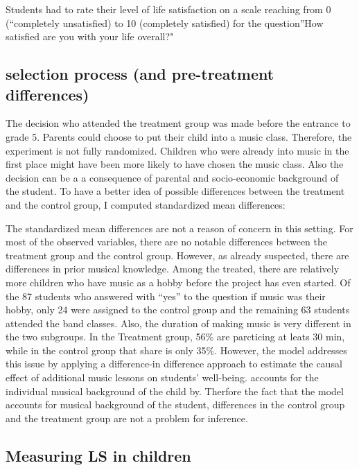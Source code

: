 \documentclass[a4, 12pt]{article}
\begin{document}
Students had to rate their level of life satisfaction on a scale reaching from 0 (``completely unsatisfied) to 10 (completely satisfied) for the question''How satisfied are you with your life overall?"

\hypertarget{selection-process-and-pre-treatment-differences}{%
\subsection{selection process (and pre-treatment differences)}\label{selection-process-and-pre-treatment-differences}}

The decision who attended the treatment group was made before the entrance to grade 5. Parents could choose to put their child into a music class. Therefore, the experiment is not fully randomized. Children who were already into music in the first place might have been more likely to have chosen the music class. Also the decision can be a a consequence of parental and socio-economic background of the student. To have a better idea of possible differences between the treatment and the control group, I computed standardized mean differences:

The standardized mean differences are not a reason of concern in this setting. For most of the observed variables, there are no notable differences between the treatment group and the control group. However, as already suspected, there are differences in prior musical knowledge. Among the treated, there are relatively more children who have music as a hobby before the project has even started. Of the 87 students who answered with ``yes'' to the question if music was their hobby, only 24 were assigned to the control group and the remaining 63 students attended the band classes. Also, the duration of making music is very different in the two subgroups. In the Treatment group, 56\% are parcticing at leats 30 min, while in the control group that share is only 35\%. However, the model addresses this issue by applying a difference-in difference approach to estimate the causal effect of additional music lessons on students' well-being. accounts for the individual musical background of the child by. Therfore the fact that the model accounts for musical background of the student, differences in the control group and the treatment group are not a problem for inference.

\hypertarget{measuring-ls-in-children}{%
\subsection{Measuring LS in children}\label{measuring-ls-in-children}}
\end{document}
